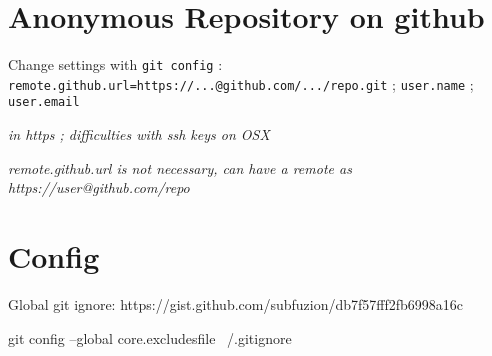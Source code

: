 \section*{Anonymous Repository on github}

Change settings with \texttt{git config} : \texttt{remote.github.url=https://...@github.com/.../repo.git} ; \texttt{user.name} ; \texttt{user.email}

\textit{in https ; difficulties with ssh keys on OSX}

\textit{remote.github.url is not necessary, can have a remote as https://user@github.com/repo}



\section*{Config}

Global git ignore: https://gist.github.com/subfuzion/db7f57fff2fb6998a16c

git config --global core.excludesfile ~/.gitignore















